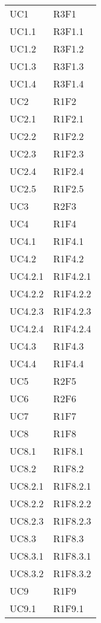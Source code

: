 \begin{longtable} {
		>{\centering}p{28mm}  
		>{}p{20mm}
		}
		UC1 & R3F1 \TBstrut \\ [2mm]
		UC1.1 & R3F1.1 \TBstrut \\ [2mm]
		UC1.2 & R3F1.2 \TBstrut \\ [2mm]
		UC1.3 & R3F1.3 \TBstrut \\ [2mm]
		UC1.4 & R3F1.4 \TBstrut \\ [2mm]
		UC2 & R1F2 \TBstrut \\ [2mm]
		UC2.1 & R1F2.1 \TBstrut \\ [2mm]
		UC2.2 & R1F2.2 \TBstrut \\ [2mm]
		UC2.3 & R1F2.3 \TBstrut \\ [2mm]
		UC2.4 & R1F2.4 \TBstrut \\ [2mm]
		UC2.5 & R1F2.5 \TBstrut \\ [2mm]
		UC3 & R2F3 \TBstrut \\ [2mm]
		UC4 & R1F4 \TBstrut \\ [2mm]
		UC4.1 & R1F4.1 \TBstrut \\ [2mm]
		UC4.2 & R1F4.2 \TBstrut \\ [2mm]
		UC4.2.1 & R1F4.2.1 \TBstrut \\ [2mm]
		UC4.2.2 & R1F4.2.2 \TBstrut \\ [2mm]
		UC4.2.3 & R1F4.2.3 \TBstrut \\ [2mm]
		UC4.2.4 & R1F4.2.4 \TBstrut \\ [2mm]
		UC4.3 & R1F4.3 \TBstrut \\ [2mm]
		UC4.4 & R1F4.4 \TBstrut \\ [2mm]
		UC5 & R2F5 \TBstrut \\ [2mm]
		UC6 & R2F6 \TBstrut \\ [2mm]
		UC7 & R1F7 \TBstrut \\ [2mm]
		UC8 & R1F8 \TBstrut \\ [2mm]
		UC8.1 & R1F8.1 \TBstrut \\ [2mm]
		UC8.2 & R1F8.2 \TBstrut \\ [2mm]
		UC8.2.1 & R1F8.2.1 \TBstrut \\ [2mm]
		UC8.2.2 & R1F8.2.2 \TBstrut \\ [2mm]
		UC8.2.3 & R1F8.2.3 \TBstrut \\ [2mm]
		UC8.3 & R1F8.3 \TBstrut \\ [2mm]
		UC8.3.1 & R1F8.3.1 \TBstrut \\ [2mm]
		UC8.3.2 & R1F8.3.2 \TBstrut \\ [2mm]
		UC9 & R1F9 \TBstrut \\ [2mm]
		UC9.1 & R1F9.1 \TBstrut \\ [2mm]

\end{longtable}
